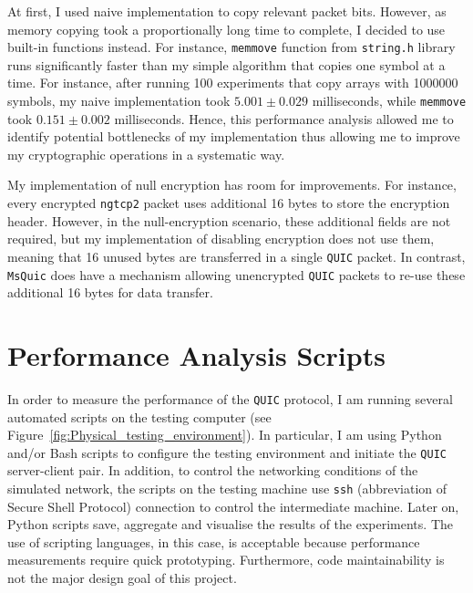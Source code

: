 \documentclass[12pt,a4paper,twoside,openright]{report}
\begin{document}
At first, I used naive implementation to copy relevant packet bits.
However, as memory copying took a proportionally long time to complete, I decided to use built-in functions instead.
For instance, \texttt{memmove} function from \texttt{string.h} library runs significantly faster than my simple algorithm that copies one symbol at a time.
For instance, after running 100 experiments that copy arrays with 1000000 symbols, my naive implementation took $5.001 \pm 0.029$ milliseconds, while \texttt{memmove} took $0.151 \pm 0.002$ milliseconds.
Hence, this performance analysis allowed me to identify potential bottlenecks of my implementation thus allowing me to improve my cryptographic operations in a systematic way.





My implementation of null encryption has room for improvements.
For instance, every encrypted \texttt{ngtcp2} packet uses additional 16 bytes to store the encryption header.
However, in the null-encryption scenario, these additional fields are not required, but my implementation of disabling encryption does not use them, meaning that 16 unused bytes are transferred in a single \texttt{QUIC} packet.
In contrast, \texttt{MsQuic} does have a mechanism allowing unencrypted \texttt{QUIC} packets to re-use these additional 16 bytes for data transfer.



\section{Performance Analysis Scripts}

In order to measure the performance of the \texttt{QUIC} protocol, I am running several automated scripts on the testing computer (see Figure~\ref{fig:Physical_testing_environment}).
In particular, I am using Python and/or Bash scripts to configure the testing environment and initiate the \texttt{QUIC} server-client pair.
In addition, to control the networking conditions of the simulated network, the scripts on the testing machine use \texttt{ssh} (abbreviation of Secure Shell Protocol) connection to control the intermediate machine.
Later on, Python scripts save, aggregate and visualise the results of the experiments.
The use of scripting languages, in this case, is acceptable because performance measurements require quick prototyping.
Furthermore, code maintainability is not the major design goal of this project.
\end{document}

